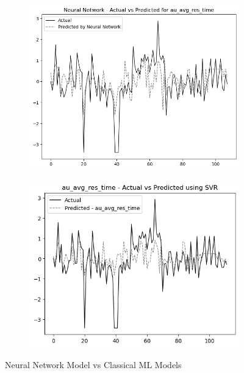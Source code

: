 \begin{figure}
    \begin{subfigure}[b]{0.49\textwidth}
        \centering
        \includegraphics[width=\linewidth]{images/all_data_audio_avg_response_time.png}
    \end{subfigure}\hfill
    \begin{subfigure}[b]{0.49\textwidth}
        \centering
        \includegraphics[width=\linewidth]{images/all_data_audio_average_response_time.png}
    \end{subfigure}
    
    \caption{Neural Network Model vs Classical ML Models}
    \label{fig:nn_comparison}
\end{figure}



